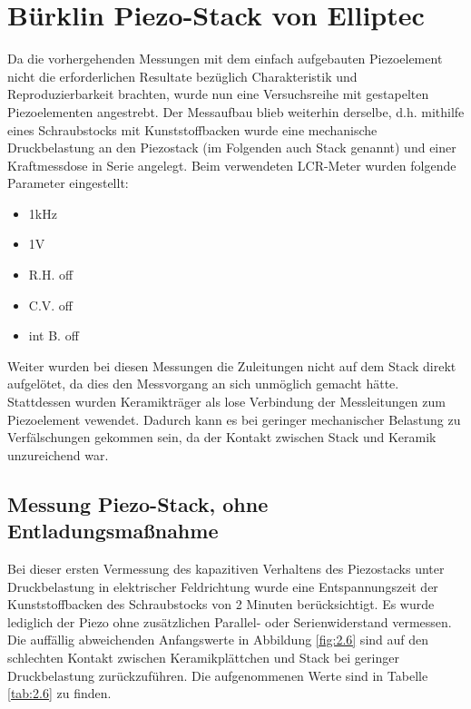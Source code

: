 \documentclass[11pt]{scrreprt} %
\begin{document}
\section{Bürklin Piezo-Stack von Elliptec}
Da die vorhergehenden Messungen mit dem einfach aufgebauten Piezoelement nicht die erforderlichen Resultate bezüglich Charakteristik und Reproduzierbarkeit brachten, wurde nun eine Versuchsreihe mit gestapelten Piezoelementen angestrebt. Der Messaufbau blieb weiterhin derselbe, d.h. mithilfe eines Schraubstocks mit Kunststoffbacken wurde eine mechanische Druckbelastung an den Piezostack (im Folgenden auch Stack genannt) und einer Kraftmessdose in Serie angelegt. Beim verwendeten LCR-Meter wurden folgende Parameter eingestellt:
\begin{itemize}
\item 1kHz
\item 1V
\item R.H. off
\item C.V. off
\item int B. off
\end{itemize}
Weiter wurden bei diesen Messungen die Zuleitungen nicht auf dem Stack direkt aufgelötet, da dies den Messvorgang an sich unmöglich gemacht hätte. Stattdessen wurden Keramikträger als lose Verbindung der Messleitungen zum Piezoelement vewendet. Dadurch kann es bei geringer mechanischer Belastung zu Verfälschungen gekommen sein, da der Kontakt zwischen Stack und Keramik unzureichend war.
\subsection{Messung Piezo-Stack, ohne Entladungsmaßnahme}
Bei dieser ersten Vermessung des kapazitiven Verhaltens des Piezostacks unter Druckbelastung in elektrischer Feldrichtung wurde eine Entspannungszeit der Kunststoffbacken des Schraubstocks von 2 Minuten berücksichtigt. Es wurde lediglich der Piezo ohne zusätzlichen Parallel- oder Serienwiderstand vermessen. Die auffällig abweichenden Anfangswerte in Abbildung \vref{fig:2.6} sind auf den schlechten Kontakt zwischen Keramikplättchen und Stack bei geringer Druckbelastung zurückzuführen. Die aufgenommenen Werte sind in Tabelle \vref{tab:2.6} zu finden.
\end{document}
